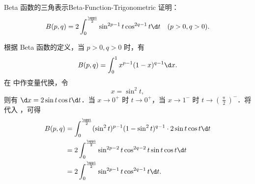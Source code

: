 \begin{problem}{Beta 函数的三角表示}{Beta-Function-Trigonometric}
    证明：
    \begin{equation}\label{eq:beta-identity}
        B(p, q) = 2 \int_{0}^{\frac{\uppi}{2}} \sin^{2p-1} t \cos^{2q-1} t \d t \quad (p > 0, q > 0).
    \end{equation}
\end{problem}

\begin{myproof}
    根据 Beta 函数的定义，当 $p > 0, q > 0$ 时，有
    \begin{equation}\label{eq:beta-def}
        B(p, q) = \int_{0}^{1} x^{p-1} (1-x)^{q-1} \d x.
    \end{equation}
    在  中作变量代换，令
    \begin{equation}\label{eq:beta-sub}
        x = \sin^2 t,
    \end{equation}
    则有 $\d x = 2 \sin t \cos t \d t$．当 $x \to 0^+$ 时 $t \to 0^+$，当 $x \to 1^-$ 时 $t \to \left(\frac{\uppi}{2}\right)^-$．将  代入 ，可得
    \begin{equation}\label{eq:beta-derivation}
        \begin{aligned}
            B(p, q) & = \int_{0}^{\frac{\uppi}{2}} (\sin^2 t)^{p-1} (1 - \sin^2 t)^{q-1} \cdot 2 \sin t \cos t \d t \\
                    & = 2 \int_{0}^{\frac{\uppi}{2}} \sin^{2p-2} t \cos^{2q-2} t \sin t \cos t \d t                 \\
                    & = 2 \int_{0}^{\frac{\uppi}{2}} \sin^{2p-1} t \cos^{2q-1} t \d t.
        \end{aligned}
    \end{equation}
\end{myproof}

